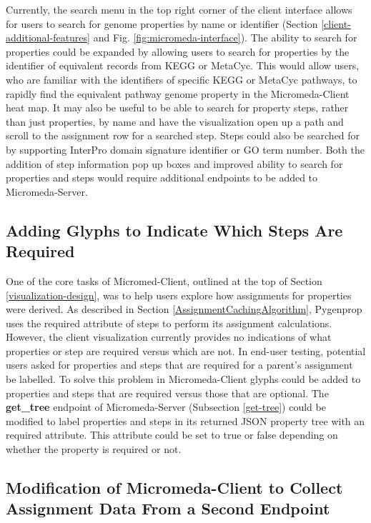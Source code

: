 Currently, the search menu in the top right corner of the client interface allows for users to search for genome properties by name or identifier (Section \ref{client-additional-features} and Fig. \ref{fig:micromeda-interface}). The ability to search for properties could be expanded by allowing users to search for properties by the identifier of equivalent records from KEGG or MetaCyc. This would allow users, who are familiar with the identifiers of specific KEGG or MetaCyc pathways, to rapidly find the equivalent pathway genome property in the Micromeda-Client heat map. It may also be useful to be able to search for property steps, rather than just properties, by name and have the visualization open up a path and scroll to the assignment row for a searched step. Steps could also be searched for by supporting InterPro domain signature identifier or GO term number. Both the addition of step information pop up boxes and improved ability to search for properties and steps would require additional endpoints to be added to Micromeda-Server.

\subsection{Adding Glyphs to Indicate Which Steps Are Required}

One of the core tasks of Micromed-Client, outlined at the top of Section \ref{visualization-design}, was to help users explore how assignments for properties were derived. As described in Section \ref{AssignmentCachingAlgorithm}, Pygenprop uses the required attribute of steps to perform its assignment calculations. However, the client visualization currently provides no indications of what properties or step are required versus which are not. In end-user testing, potential users asked for properties and steps that are required for a parent's assignment be labelled. To solve this problem in Micromeda-Client glyphs could be added to properties and steps that are required versus those that are optional. The \textbf{get\_tree} endpoint of Micromeda-Server (Subsection \ref{get-tree}) could be modified to label properties and steps in its returned JSON property tree with an required attribute. This attribute could be set to true or false depending on whether the property is required or not. 

\subsection{Modification of Micromeda-Client to Collect Assignment Data From a Second Endpoint}

